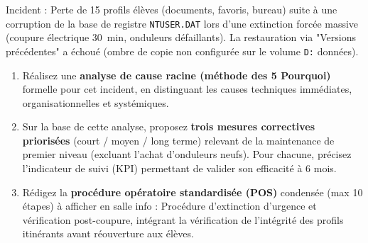\documentclass[11pt]{article}
\begin{document}
\begin{exercice}
Incident : Perte de \num{15} profils élèves (documents, favoris, bureau) suite à une corruption de la base de registre \texttt{NTUSER.DAT} lors d'une extinction forcée massive (coupure électrique \SI{30}{min}, onduleurs défaillants). La restauration via "Versions précédentes" a échoué (ombre de copie non configurée sur le volume \texttt{D:} données).
\begin{enumerate}
    \item Réalisez une \textbf{analyse de cause racine (méthode des 5 Pourquoi)} formelle pour cet incident, en distinguant les causes techniques immédiates, organisationnelles et systémiques.
    \item Sur la base de cette analyse, proposez \textbf{trois mesures correctives priorisées} (court / moyen / long terme) relevant de la maintenance de premier niveau (excluant l'achat d'onduleurs neufs). Pour chacune, précisez l'indicateur de suivi (KPI) permettant de valider son efficacité à \num{6} mois.
    \item Rédigez la \textbf{procédure opératoire standardisée (POS)} condensée (max \num{10} étapes) à afficher en salle info : \og Procédure d'extinction d'urgence et vérification post-coupure\fg{}, intégrant la vérification de l'intégrité des profils itinérants avant réouverture aux élèves.
\end{enumerate}
\end{exercice}
\end{document}
